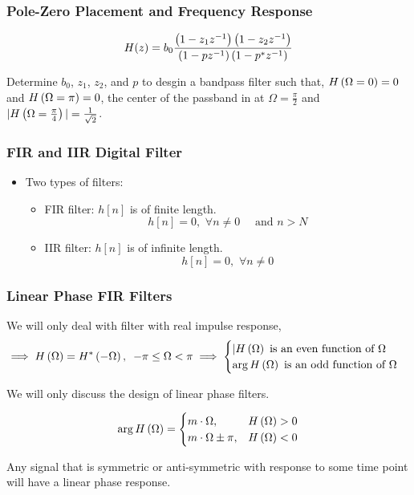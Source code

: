 \documentclass[aspectratio=169]{beamer}
\let\olditem\item
\renewcommand{\item}{\setlength{\itemsep}{\fill}\olditem}
\def\lp{\ensuremath\left(}
\def\rp{\ensuremath\right)}
\begin{document}
\begin{frame}[t]
  \frametitle{Pole-Zero Placement and Frequency Response}
  \[ H(z) = b_0\frac{\lp 1 - z_1z^{-1}\rp \lp 1 - z_2z^{-1}\rp}{\lp 1 - pz^{-1} \rp \lp 1 - p^{*}z^{-1} \rp} \]

  Determine $b_0$, $z_1$, $z_2$, and $p$ to desgin a bandpass filter such that, $H \lp \Omega = 0\rp = 0$ and $H \lp \Omega = \pi \rp = 0$, the center of the passband in at $\Omega = \frac{\pi}{2}$ and $\vert H\lp \Omega = \frac{\pi}{4} \rp \vert = \frac{1}{\sqrt{2}}$.
\end{frame}


\begin{frame}[t]
  \frametitle{FIR and IIR Digital Filter}
  \begin{itemize}
    \item Two types of filters:
    \begin{itemize}
      \item FIR filter: $h[n]$ is of finite length.
      \[ h[n] = 0, \,\, \forall n \neq 0 \quad \text{ and } n > N \]
      \item IIR filter: $h[n]$ is of infinite length.
      \[ h[n] = 0, \,\, \forall n \neq 0 \]
    \end{itemize}
  \end{itemize}
\end{frame}


\begin{frame}[t]
  \frametitle{Linear Phase FIR Filters}

  We will only deal with filter with real impulse response,
  \[ \implies H\lp \Omega \rp = H^*\lp -\Omega \rp, \,\,\, -\pi \leq \Omega < \pi \implies \begin{cases} \vert H\lp \Omega \rp \text{ is an even function of } \Omega \\
  \arg H\lp \Omega \rp \text{ is an odd function of } \Omega \end{cases} \]

  We will only discuss the design of linear phase filters.

  \[  \arg H\lp \Omega \rp = \begin{cases} m \cdot \Omega, & H\lp \Omega  \rp > 0 \\ m \cdot \Omega \pm \pi, & H\lp \Omega \rp < 0 \end{cases} \]
  \vspace{0.1cm}

  Any signal that is symmetric or anti-symmetric with response to some time point will have a linear phase response.
  \vspace{0.25cm}
\end{frame}
\end{document}
